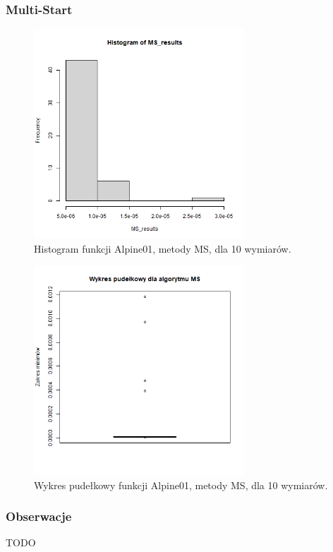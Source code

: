 \documentclass{lab}
\begin{document}
\subsubsection{Multi-Start}
\begin{figure}[H]
  \centering
  \includegraphics[width=0.7\textwidth]{img/dim10_MS_Alpine01_his.png}
  \caption{Histogram funkcji Alpine01, metody MS, dla 10 wymiarów.}
\end{figure}
\begin{figure}[H]
  \centering
  \includegraphics[width=0.7\textwidth]{img/dim10_MS_Alpine01.png}
  \caption{Wykres pudełkowy funkcji Alpine01, metody MS, dla 10 wymiarów.}
\end{figure}

\subsubsection{Obserwacje}
TODO
\end{document}
